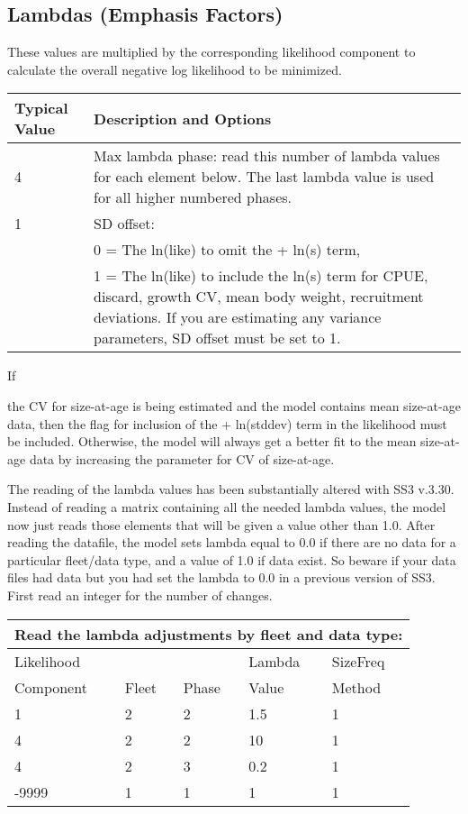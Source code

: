 \hypertarget{Lambdas}{}
\subsection{Lambdas (Emphasis Factors)}
These values are multiplied by the corresponding likelihood component to calculate the overall negative log likelihood to be minimized.


\begin{tabular}{p{3cm} p{13cm}}
	\hline
	Typical Value & Description and Options\Tstrut\Bstrut\\
	\hline
	4 \Tstrut & Max lambda phase: read this number of lambda values for each element below.  The last lambda value is used for all higher numbered phases.\Bstrut\\
	1 & SD offset: \\
	  & 0 = The ln(like) to omit the + ln(s) term,\\
	  & 1 = The ln(like) to include the ln(s) term for CPUE, discard, growth CV, mean body weight, recruitment deviations. If you are estimating any variance parameters, SD offset must be set to 1.  \Bstrut\\
	\hline
\end{tabular}

\pagebreak

\hypertarget{SaAlambda}{If} the CV for size-at-age is being estimated and the model contains mean size-at-age data, then the flag for inclusion of the + ln(stddev) term in the likelihood must be included. Otherwise, the model will always get a better fit to the mean size-at-age data by increasing the parameter for CV of size-at-age.

The reading of the lambda values has been substantially altered with SS3 v.3.30. Instead of reading a matrix containing all the needed lambda values, the model now just reads those elements that will be given a value other than 1.0.  After reading the datafile, the model sets lambda equal to 0.0 if there are no data for a particular fleet/data type, and a value of 1.0 if data exist. So beware if your data files had data but you had set the lambda to 0.0 in a previous version of SS3.  First read an integer for the number of changes.


\begin{longtable}{p{3cm} p{3cm} p{2cm} p{3cm} p{3cm}}

	\multicolumn{5}{l}{Read the lambda adjustments by fleet and data type:}\\
	\hline
	Likelihood &       &       & Lambda & SizeFreq\Tstrut\\
	Component  & Fleet & Phase & Value  & Method \Bstrut\\
	\hline
	1 & 2 & 2 & 1.5 & 1 \Tstrut\\
	4 & 2 & 2 & 10 & 1 \\
	4 & 2 & 3 & 0.2 & 1 \\
	-9999 & 1 & 1 & 1 & 1 \Bstrut\\
	\hline
\end{longtable}


